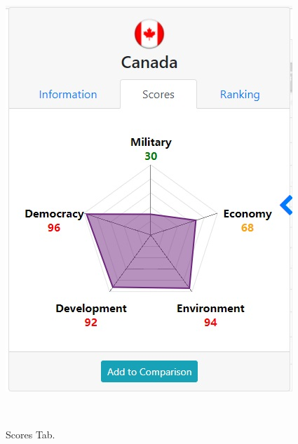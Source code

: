 \documentclass[12pt, fullpage,letterpaper]{article}
\begin{document}
\begin{figure}[h!]
\begin{minipage}{0.31\linewidth}
        \includegraphics[width=\textwidth]{figs/info2.jpg}
        \caption{Scores Tab.}
        \label{fig:info2}
    \end{minipage}
    \hfill\
    \begin{minipage}{0.31\linewidth}
        \centering

\end{minipage}
\end{figure}
\end{document}
